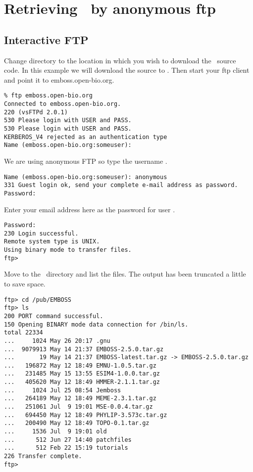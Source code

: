 \documentclass{report}
\begin{document}
\section{Retrieving \EMBOSS\ by anonymous ftp}
\subsection{Interactive FTP}

Change directory to the location in which you wish to download the
\EMBOSS\ source code. In this example we will download the source to
. Then start your ftp client and point it
to emboss.open-bio.org.

\begin{verbatim}
% ftp emboss.open-bio.org
Connected to emboss.open-bio.org.
220 (vsFTPd 2.0.1)
530 Please login with USER and PASS.
530 Please login with USER and PASS.
KERBEROS_V4 rejected as an authentication type
Name (emboss.open-bio.org:someuser):
\end{verbatim}

We are using anonymous FTP so type the username .

\begin{verbatim}
Name (emboss.open-bio.org:someuser): anonymous
331 Guest login ok, send your complete e-mail address as password.
Password:
\end{verbatim}

Enter your email address here as the password for user .

\begin{verbatim}
Password:
230 Login successful.
Remote system type is UNIX.
Using binary mode to transfer files.
ftp>
\end{verbatim}

Move to the \EMBOSS\ directory and list the files. The output has been
truncated a little to save space.

\begin{verbatim}
ftp> cd /pub/EMBOSS
ftp> ls
200 PORT command successful.
150 Opening BINARY mode data connection for /bin/ls.
total 22334
...     1024 May 26 20:17 .gnu
...  9079913 May 14 21:37 EMBOSS-2.5.0.tar.gz
...       19 May 14 21:37 EMBOSS-latest.tar.gz -> EMBOSS-2.5.0.tar.gz
...   196872 May 12 18:49 EMNU-1.0.5.tar.gz
...   231485 May 15 13:55 ESIM4-1.0.0.tar.gz
...   405620 May 12 18:49 HMMER-2.1.1.tar.gz
...     1024 Jul 25 08:54 Jemboss
...   264189 May 12 18:49 MEME-2.3.1.tar.gz
...   251061 Jul  9 19:01 MSE-0.0.4.tar.gz
...   694450 May 12 18:49 PHYLIP-3.573c.tar.gz
...   200490 May 12 18:49 TOPO-0.1.tar.gz
...     1536 Jul  9 19:01 old
...      512 Jun 27 14:40 patchfiles
...      512 Feb 22 15:19 tutorials
226 Transfer complete.
ftp>
\end{verbatim}
\end{document}
